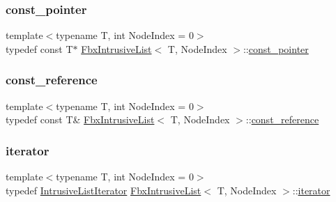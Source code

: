 \mbox{\label{class_fbx_intrusive_list_ae8232fd6a6ef678e5d5eed6ad978994c}} 
\subsubsection{\texorpdfstring{const\+\_\+pointer}{const\_pointer}}
{\footnotesize\ttfamily template$<$typename T, int Node\+Index = 0$>$ \\
typedef const T$\ast$ \hyperlink{class_fbx_intrusive_list}{Fbx\+Intrusive\+List}$<$ T, Node\+Index $>$\+::\hyperlink{class_fbx_intrusive_list_ae8232fd6a6ef678e5d5eed6ad978994c}{const\+\_\+pointer}}

\mbox{\label{class_fbx_intrusive_list_a21904cb72c0ccae9d5c0b9f171befeb8}} 
\subsubsection{\texorpdfstring{const\+\_\+reference}{const\_reference}}
{\footnotesize\ttfamily template$<$typename T, int Node\+Index = 0$>$ \\
typedef const T\& \hyperlink{class_fbx_intrusive_list}{Fbx\+Intrusive\+List}$<$ T, Node\+Index $>$\+::\hyperlink{class_fbx_intrusive_list_a21904cb72c0ccae9d5c0b9f171befeb8}{const\+\_\+reference}}

\mbox{\label{class_fbx_intrusive_list_ae1012cd86e3ff0a4a49c982f0d34b4e7}} 
\subsubsection{\texorpdfstring{iterator}{iterator}}
{\footnotesize\ttfamily template$<$typename T, int Node\+Index = 0$>$ \\
typedef \hyperlink{class_fbx_intrusive_list_1_1_intrusive_list_iterator}{Intrusive\+List\+Iterator} \hyperlink{class_fbx_intrusive_list}{Fbx\+Intrusive\+List}$<$ T, Node\+Index $>$\+::\hyperlink{class_fbx_intrusive_list_ae1012cd86e3ff0a4a49c982f0d34b4e7}{iterator}}

